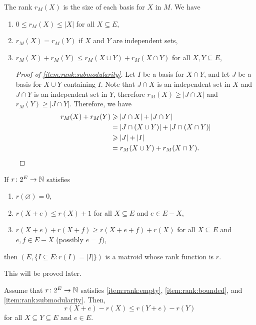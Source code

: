 The rank \(r_M(X)\) is the size of each basis for \(X\) in \(M\).
We have
\begin{enumerate}[label = \textup{(R\arabic*)}]
    \item \(0 \leq r_M(X) \leq |X|\) for all \(X \subseteq E\), \label{item:rank:bounded}
    \item \(r_M(X) = r_M(Y)\) if \(X\) and \(Y\) are independent sets, \label{item:rank:subset}
    \item \(r_M(X) + r_M(Y) \leq r_M(X \cup Y) + r_M(X \cap Y)\) for all \(X, Y \subseteq E\), \label{item:rank:submodularity}
    
    \begin{proof}[Proof of \ref{item:rank:submodularity}]
        Let \(I\) be a basis for \(X \cap Y\), and let \(J\) be a basis for \(X \cup Y\) containing \(I\).
        Note that \(J \cap X\) is an independent set in \(X\) and \(J \cap Y\) is an independent set in \(Y\),
        therefore \(r_M(X) \geq |J \cap X|\) and \(r_M(Y) \geq |J \cap Y|\).
        Therefore, we have
        \begin{align*}
            r_M(X) + r_M(Y) &\geq |J \cap X| + |J \cap Y| \\
            &= |J \cap (X \cup Y)| + |J \cap (X \cap Y)| \\
            &\geq |J| + |I| \\
            &= r_M(X \cup Y) + r_M(X \cap Y). \qedhere
        \end{align*}
    \end{proof}
\end{enumerate}

\begin{proposition}
    If \(r \colon 2^E \to \nonnegatives\) satisfies
    \begin{enumerate}[label = \textup{(r\arabic*)}]
        \item \(r(\varnothing) = 0\), \label{item:rank:empty}
        \item \(r(X + e) \leq r(X) + 1\) for all \(X \subseteq E\) and \(e \in E - X\), \label{item:rank:step}
        \item \(r(X + e) + r(X + f) \geq  r(X + e + f) + r(X)\) for all \(X \subseteq E\) and \(e, f \in E - X\) (possibly \(e = f\)), \label{item:rank:submodularity2}
    \end{enumerate}
    then \((E, \{I \subseteq E : r(I) = |I|\})\) is a matroid whose rank function is \(r\).
\end{proposition}

This will be proved later.

\begin{lemma}
    Assume that \(r \colon 2^E \to \nonnegatives\) satisfies \ref{item:rank:empty}, \ref{item:rank:bounded}, and \ref{item:rank:submodularity}.
    Then,
    \begin{equation}
        r(X + e) - r(X) \leq r(Y + e) - r(Y)
    \end{equation}
    for all \(X \subseteq Y \subseteq E\) and \(e \in E\).
\end{lemma}